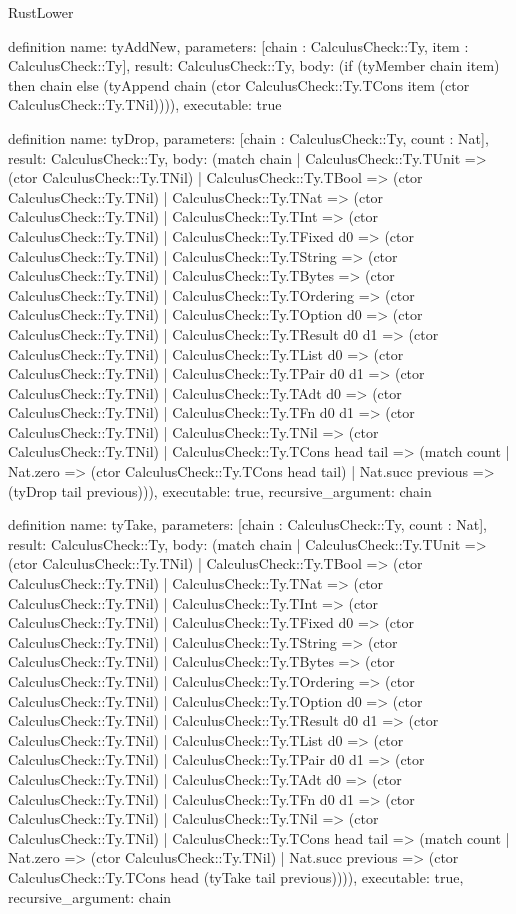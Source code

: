 \begin{lexlean}{RustLower}
\begin{semanticmodule}
definition{
  name: tyAddNew,
  parameters: [chain : CalculusCheck::Ty, item : CalculusCheck::Ty],
  result: CalculusCheck::Ty,
  body: (if (tyMember chain item) then chain else (tyAppend chain (ctor CalculusCheck::Ty.TCons item (ctor CalculusCheck::Ty.TNil)))),
  executable: true
}

definition{
  name: tyDrop,
  parameters: [chain : CalculusCheck::Ty, count : Nat],
  result: CalculusCheck::Ty,
  body: (match chain
    | CalculusCheck::Ty.TUnit => (ctor CalculusCheck::Ty.TNil)
    | CalculusCheck::Ty.TBool => (ctor CalculusCheck::Ty.TNil)
    | CalculusCheck::Ty.TNat => (ctor CalculusCheck::Ty.TNil)
    | CalculusCheck::Ty.TInt => (ctor CalculusCheck::Ty.TNil)
    | CalculusCheck::Ty.TFixed d0 => (ctor CalculusCheck::Ty.TNil)
    | CalculusCheck::Ty.TString => (ctor CalculusCheck::Ty.TNil)
    | CalculusCheck::Ty.TBytes => (ctor CalculusCheck::Ty.TNil)
    | CalculusCheck::Ty.TOrdering => (ctor CalculusCheck::Ty.TNil)
    | CalculusCheck::Ty.TOption d0 => (ctor CalculusCheck::Ty.TNil)
    | CalculusCheck::Ty.TResult d0 d1 => (ctor CalculusCheck::Ty.TNil)
    | CalculusCheck::Ty.TList d0 => (ctor CalculusCheck::Ty.TNil)
    | CalculusCheck::Ty.TPair d0 d1 => (ctor CalculusCheck::Ty.TNil)
    | CalculusCheck::Ty.TAdt d0 => (ctor CalculusCheck::Ty.TNil)
    | CalculusCheck::Ty.TFn d0 d1 => (ctor CalculusCheck::Ty.TNil)
    | CalculusCheck::Ty.TNil => (ctor CalculusCheck::Ty.TNil)
    | CalculusCheck::Ty.TCons head tail => (match count
      | Nat.zero => (ctor CalculusCheck::Ty.TCons head tail)
      | Nat.succ previous => (tyDrop tail previous))),
  executable: true,
  recursive_argument: chain
}

definition{
  name: tyTake,
  parameters: [chain : CalculusCheck::Ty, count : Nat],
  result: CalculusCheck::Ty,
  body: (match chain
    | CalculusCheck::Ty.TUnit => (ctor CalculusCheck::Ty.TNil)
    | CalculusCheck::Ty.TBool => (ctor CalculusCheck::Ty.TNil)
    | CalculusCheck::Ty.TNat => (ctor CalculusCheck::Ty.TNil)
    | CalculusCheck::Ty.TInt => (ctor CalculusCheck::Ty.TNil)
    | CalculusCheck::Ty.TFixed d0 => (ctor CalculusCheck::Ty.TNil)
    | CalculusCheck::Ty.TString => (ctor CalculusCheck::Ty.TNil)
    | CalculusCheck::Ty.TBytes => (ctor CalculusCheck::Ty.TNil)
    | CalculusCheck::Ty.TOrdering => (ctor CalculusCheck::Ty.TNil)
    | CalculusCheck::Ty.TOption d0 => (ctor CalculusCheck::Ty.TNil)
    | CalculusCheck::Ty.TResult d0 d1 => (ctor CalculusCheck::Ty.TNil)
    | CalculusCheck::Ty.TList d0 => (ctor CalculusCheck::Ty.TNil)
    | CalculusCheck::Ty.TPair d0 d1 => (ctor CalculusCheck::Ty.TNil)
    | CalculusCheck::Ty.TAdt d0 => (ctor CalculusCheck::Ty.TNil)
    | CalculusCheck::Ty.TFn d0 d1 => (ctor CalculusCheck::Ty.TNil)
    | CalculusCheck::Ty.TNil => (ctor CalculusCheck::Ty.TNil)
    | CalculusCheck::Ty.TCons head tail => (match count
      | Nat.zero => (ctor CalculusCheck::Ty.TNil)
      | Nat.succ previous => (ctor CalculusCheck::Ty.TCons head (tyTake tail previous)))),
  executable: true,
  recursive_argument: chain
}


\end{semanticmodule}
\end{lexlean}
